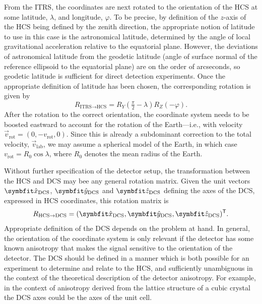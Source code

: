 From the ITRS, the coordinates are next rotated to the orientation of the HCS at some latitude, $\lambda$, and longitude, $\varphi$. To be precise, by definition of the $z$-axis of the HCS being defined by the zenith direction, the appropriate notion of latitude to use in this case is the astronomical latitude, determined by the angle of local gravitational acceleration relative to the equatorial plane. However, the deviations of astronomical latitude from the geodetic latitude (angle of surface normal of the reference ellipsoid to the equatorial plane) are on the order of arcseconds, so geodetic latitude is sufficient for direct detection experiments. Once the appropriate definition of latitude has been chosen, the corresponding rotation is given by
\begin{equation}
    R_{\text{ITRS}\rightarrow\text{HCS}}=R_Y(\tfrac{\pi}{2}-\lambda)R_Z(-\varphi).
\end{equation}
After the rotation to the correct orientation, the coordinate system needs to be boosted eastward to account for the rotation of the Earth---i.e., with velocity $\vec{v}_\text{rot}=(0,-v_\text{rot},0)$. Since this is already a subdominant correction to the total velocity, $\vec{v}_\text{lab}$, we may assume a spherical model of the Earth, in which case $v_\text{rot}=R_0\cos\lambda$, where $R_0$ denotes the mean radius of the Earth.

Without further specification of the detector setup, the transformation between the HCS and DCS may bee any general rotation matrix. Given the unit vectors $\unitv{x}_\text{DCS}$, $\unitv{y}_\text{DCS}$ and $\unitv{z}_\text{DCS}$ defining the axes of the DCS, expressed in HCS coordinates, this rotation matrix is
\begin{equation}
    R_{\text{HCS}\rightarrow\text{DCS}}=
    (
        \unitv{x}_\text{DCS},
        \unitv{y}_\text{DCS},
        \unitv{z}_\text{DCS}
    )^\transp.
\end{equation}
Appropriate definition of the DCS depends on the problem at hand. In general, the orientation of the coordinate system is only relevant if the detector has some known anisotropy that makes the signal sensitive to the orientation of the detector. The DCS should be defined in a manner which is both possible for an experiment to determine and relate to the HCS, and sufficiently unambiguous in the context of the theoretical description of the detector anisotropy. For example, in the context of anisotropy derived from the lattice structure of a cubic crystal the DCS axes could be the axes of the unit cell.


